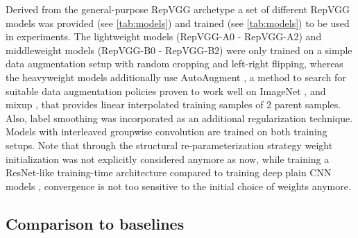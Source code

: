 Derived from the general-purpose RepVGG archetype a set of different RepVGG models was provided (see \autoref{tab:models}) and trained (see \autoref{tab:models}) to be used in experiments. The lightweight models (RepVGG-A0 - RepVGG-A2) and middleweight models (RepVGG-B0 - RepVGG-B2) were only trained on a simple data augmentation setup \cite{PyTorch.2020} with random cropping and left-right flipping, whereas the heavyweight models additionally use AutoAugment \cite{EkinDCubuk.2019}, a method to search for suitable data augmentation policies proven to work well on ImageNet \cite{JiaDeng.2009}, and mixup \cite{HongyiZhang.2018}, that provides linear interpolated training samples of 2 parent samples. Also, label smoothing \cite{ChristianSzegedy.2015} was incorporated as an additional regularization technique. Models with interleaved groupwise convolution are trained on both training setups. Note that through the structural re-parameterization strategy weight initialization was not explicitly considered anymore as now, while training a ResNet-like training-time architecture compared to training deep plain CNN models \cite{LechaoXiao.2018, OyebadeOyedotun.2020}, convergence is not too sensitive to the initial choice of weights anymore.

\subsection{Comparison to baselines}

